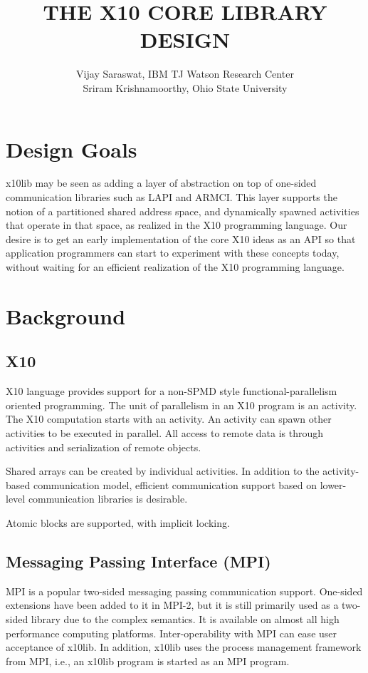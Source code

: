 \documentclass{article}
\title{THE X10 CORE LIBRARY DESIGN }
\author{Vijay Saraswat, IBM TJ Watson Research Center \\
  Sriram Krishnamoorthy, Ohio State University }
\begin{document}
\maketitle

\section{Design Goals}

x10lib may be seen as adding a layer of abstraction on top of
one-sided communication libraries such as LAPI and ARMCI. This layer
supports the notion of a partitioned shared address space, and
dynamically spawned activities that operate in that space, as realized
in the X10 programming language. Our desire is to get an early
implementation of the core X10 ideas as an API so that application
programmers can start to experiment with these concepts today, without
waiting for an efficient realization of the X10 programming language. 

\section{Background}

\subsection{X10}
X10 language provides support for a non-SPMD style
functional-parallelism  oriented programming. The unit of parallelism
in an X10 program is an activity. The X10 computation starts with an
activity. An activity can spawn other activities to be executed in
parallel. All access to remote data is through activities and
serialization of remote objects. 

Shared arrays can be created by individual activities. In addition to
the activity-based communication model, efficient communication
support based on lower-level communication libraries is desirable. 

Atomic blocks are supported, with implicit locking. 


\subsection{Messaging Passing Interface (MPI)}
MPI is a popular two-sided messaging passing communication
support. One-sided extensions have been added to it in MPI-2, but it
is still primarily used as a two-sided library due to the complex
semantics. It is available on almost all high performance computing
platforms. Inter-operability with MPI can ease user acceptance of
x10lib. In addition, x10lib uses the process management framework from
MPI, i.e., an x10lib program is started as an MPI program.
\end{document}
